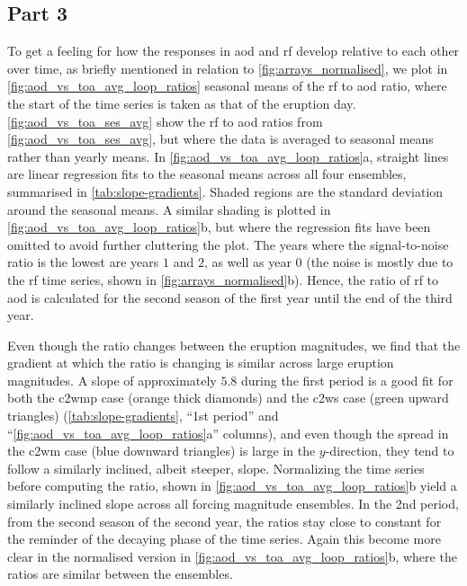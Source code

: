 \documentclass[twocol]{ametsocV6.1}
\begin{document}
\subsection{Part 3}

To get a feeling for how the responses in \gls{aod} and \gls{rf} develop relative to
each other over time, as briefly mentioned in relation to \ref{fig:arrays_normalised},
we plot in \ref{fig:aod_vs_toa_avg_loop_ratios} seasonal means of the \gls{rf} to
\gls{aod} ratio, where the start of the time series is taken as that of the eruption
day. \ref{fig:aod_vs_toa_ses_avg} show the
\gls{rf} to \gls{aod} ratios from \ref{fig:aod_vs_toa_ses_avg}, but
where the data is averaged to seasonal means rather than yearly means. In
\ref{fig:aod_vs_toa_avg_loop_ratios}a, straight lines are linear regression fits to the
seasonal means across all four ensembles, summarised in \ref{tab:slope-gradients}.
Shaded regions are the standard deviation around the seasonal means. A similar shading
is plotted in \ref{fig:aod_vs_toa_avg_loop_ratios}b, but where the regression fits
have been omitted to avoid further cluttering the plot. The years where the
signal-to-noise ratio is the lowest are years \(1\) and \(2\), as well as year \(0\)
(the noise is mostly due to the \gls{rf} time series, shown in
\ref{fig:arrays_normalised}b). Hence, the ratio of \gls{rf} to \gls{aod} is
calculated for the second season of the first year until the end of the third year.

Even though the ratio changes between the eruption magnitudes, we find that the gradient
at which the ratio is changing is similar across large eruption magnitudes. A slope of
approximately \(5.8\) during the first period is a good fit for both the \gls{c2wmp}
case (orange thick diamonds) and the \gls{c2ws} case (green upward triangles)
(\ref{tab:slope-gradients}, ``1st period'' and ``\ref{fig:aod_vs_toa_avg_loop_ratios}a''
columns), and even though the spread in the \gls{c2wm} case (blue downward triangles) is
large in the \(y\)-direction, they tend to follow a similarly inclined, albeit steeper,
slope. Normalizing the time series before computing the ratio, shown in
\ref{fig:aod_vs_toa_avg_loop_ratios}b yield a similarly inclined slope across all
forcing magnitude ensembles. In the 2nd period, from the second season of the second
year, the ratios stay close to constant for the reminder of the decaying phase of the
time series. Again this become more clear in the normalised version in
\ref{fig:aod_vs_toa_avg_loop_ratios}b, where the ratios are similar between the
ensembles.
\end{document}

